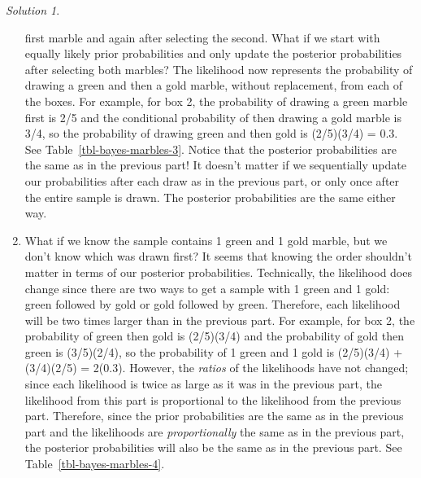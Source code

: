\documentclass[
  letterpaper,
  DIV=11,
  numbers=noendperiod]{scrreprt}
\theoremstyle{plain}
\theoremstyle{definition}
\theoremstyle{definition}
\theoremstyle{definition}
\theoremstyle{remark}
\newtheorem{refsolution}{Solution}[chapter]
\begin{document}
\begin{tcolorbox}
\begin{refsolution}
\begin{enumerate}
  first marble and again after selecting the second. What if we start
  with equally likely prior probabilities and only update the posterior
  probabilities after selecting both marbles? The likelihood now
  represents the probability of drawing a green and then a gold marble,
  without replacement, from each of the boxes. For example, for box 2,
  the probability of drawing a green marble first is 2/5 and the
  conditional probability of then drawing a gold marble is 3/4, so the
  probability of drawing green and then gold is (2/5)(3/4) = 0.3. See
  Table~\ref{tbl-bayes-marbles-3}. Notice that the posterior
  probabilities are the same as in the previous part! It doesn't matter
  if we sequentially update our probabilities after each draw as in the
  previous part, or only once after the entire sample is drawn. The
  posterior probabilities are the same either way.
\item
  What if we know the sample contains 1 green and 1 gold marble, but we
  don't know which was drawn first? It seems that knowing the order
  shouldn't matter in terms of our posterior probabilities. Technically,
  the likelihood does change since there are two ways to get a sample
  with 1 green and 1 gold: green followed by gold or gold followed by
  green. Therefore, each likelihood will be two times larger than in the
  previous part. For example, for box 2, the probability of green then
  gold is (2/5)(3/4) and the probability of gold then green is
  (3/5)(2/4), so the probability of 1 green and 1 gold is (2/5)(3/4) +
  (3/4)(2/5) = 2(0.3). However, the \emph{ratios} of the likelihoods
  have not changed; since each likelihood is twice as large as it was in
  the previous part, the likelihood from this part is proportional to
  the likelihood from the previous part. Therefore, since the prior
  probabilities are the same as in the previous part and the likelihoods
  are \emph{proportionally} the same as in the previous part, the
  posterior probabilities will also be the same as in the previous part.
  See Table~\ref{tbl-bayes-marbles-4}.
\end{enumerate}

\label{sol-bayes-marbles}

\end{refsolution}

\end{tcolorbox}
\end{document}
